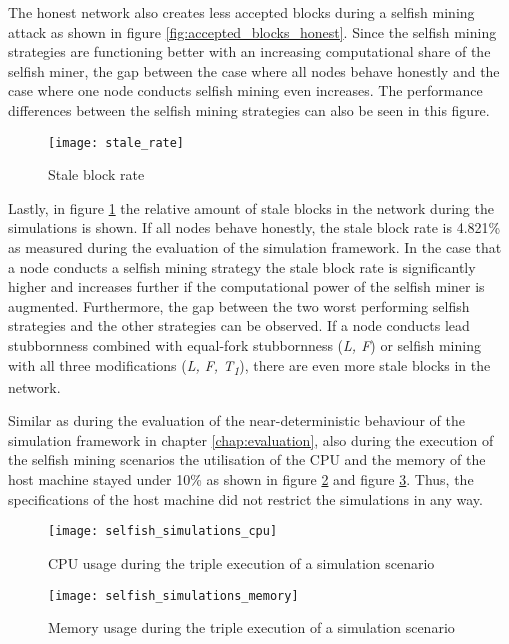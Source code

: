 The honest network also creates less accepted blocks during a selfish mining attack as shown in figure \ref{fig:accepted_blocks_honest}.
Since the selfish mining strategies are functioning better with an increasing computational share of the selfish miner, the gap between the case where all nodes behave honestly and the case where one node conducts selfish mining even increases.
The performance differences between the selfish mining strategies can also be seen in this figure.

\begin{figure}[t]
\texttt{[image: stale\_rate]}
\centering
\caption{Stale block rate}
\label{fig:stale_rate}
\end{figure}

Lastly, in figure \ref{fig:stale_rate} the relative amount of stale blocks in the network during the simulations is shown.
If all nodes behave honestly, the stale block rate is 4.821\% as measured during the evaluation of the simulation framework.
In the case that a node conducts a selfish mining strategy the stale block rate is significantly higher and increases further if the computational power of the selfish miner is augmented.
Furthermore, the gap between the two worst performing selfish strategies and the other strategies can be observed.
If a node conducts lead stubbornness combined with equal-fork stubbornness (\textit{L, F}) or selfish mining with all three modifications (\textit{L, F, T\textsubscript{1}}), there are even more stale blocks in the network.

Similar as during the evaluation of the near-deterministic behaviour of the simulation framework in chapter \ref{chap:evaluation}, also during the execution of the selfish mining scenarios the utilisation of the CPU and the memory of the host machine stayed under 10\% as shown in figure \ref{fig:selfish_simulations_cpu} and figure \ref{fig:selfish_simulations_memory}.
Thus, the specifications of the host machine did not restrict the simulations in any way.

\begin{figure}[t]
\texttt{[image: selfish\_simulations\_cpu]}
\centering
\caption{CPU usage during the triple execution of a simulation scenario}
\label{fig:selfish_simulations_cpu}
\end{figure}

\begin{figure}[t]
\texttt{[image: selfish\_simulations\_memory]}
\centering
\caption{Memory usage during the triple execution of a simulation scenario}
\label{fig:selfish_simulations_memory}
\end{figure}

